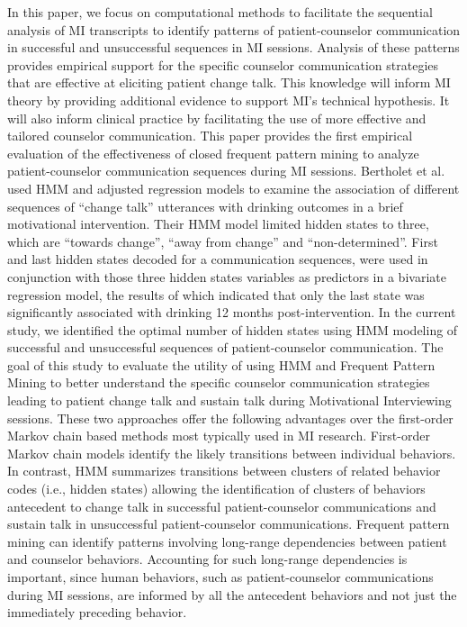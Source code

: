 In this paper, we focus on computational methods to facilitate the sequential analysis of MI transcripts to identify patterns of patient-counselor communication in successful and unsuccessful sequences in MI sessions. Analysis of these patterns provides empirical support for the specific counselor communication strategies that are effective at eliciting patient change talk. This knowledge will inform MI theory by providing additional evidence to support MI’s technical hypothesis. It will also inform clinical practice by facilitating the use of more effective and tailored counselor communication. This paper provides the first empirical evaluation of the effectiveness of closed frequent pattern mining to analyze patient-counselor communication sequences during MI sessions. Bertholet et al.~\cite{bertholet2010change} used HMM and adjusted regression models to examine the association of different sequences of ``change talk'' utterances with drinking outcomes in a brief motivational intervention. Their HMM model limited hidden states to three, which are ``towards change'', ``away from change'' and ``non-determined''. First and last hidden states decoded for a communication sequences, were used in conjunction with those three hidden states variables as predictors in a bivariate regression model, the results of which indicated that only the last state was significantly associated with drinking 12 months post-intervention. In the current study, we identified the optimal number of hidden states using HMM modeling of successful and unsuccessful sequences of patient-counselor communication. The goal of this study to evaluate the utility of using HMM and Frequent Pattern Mining to better understand the specific counselor communication strategies leading to patient change talk and sustain talk during Motivational Interviewing sessions. These two approaches offer the following advantages over the first-order Markov chain based methods most typically used in MI research. First-order Markov chain models identify the likely transitions between individual behaviors. In contrast, HMM summarizes transitions between clusters of related behavior codes (i.e., hidden states) allowing the identification of clusters of behaviors antecedent to change talk in successful patient-counselor communications and sustain talk in unsuccessful patient-counselor communications. Frequent pattern mining can identify patterns involving long-range dependencies between patient and counselor behaviors. Accounting for such long-range dependencies is important, since human behaviors, such as patient-counselor communications during MI sessions, are informed by all the antecedent behaviors and not just the immediately preceding behavior.

